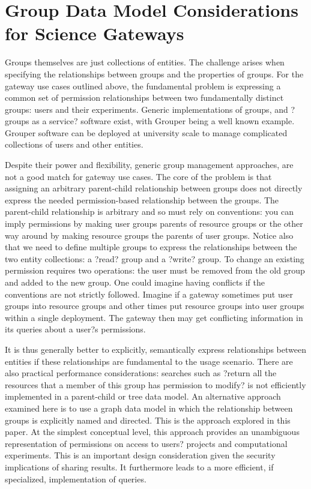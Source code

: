 \documentclass[sigconf]{acmart}
\begin{document}
\section{Group Data Model Considerations for Science Gateways}

Groups themselves are just collections of entities.  The challenge arises when specifying the relationships between groups and the properties of groups.   For the gateway use cases outlined above, the fundamental problem is expressing a common set of permission relationships between two fundamentally distinct groups: users and their experiments.  
Generic implementations of groups, and ?groups as a service? software exist, with Grouper \cite{grouperWebsite} being a well known example. Grouper software can be deployed at university scale to manage complicated collections of users and other entities.

Despite their power and flexibility, generic group management approaches, are not a good match for gateway use cases. The core of the problem is that assigning an arbitrary parent-child relationship between groups does not directly express the needed permission-based relationship between the groups.  The parent-child relationship is arbitrary and so must rely on conventions: you can imply permissions by making user groups parents of resource groups or the other way around by making resource groups the parents of user groups. Notice also that we need to define multiple groups to express the relationships between the two entity collections: a ?read? group and a ?write? group. To change an existing permission requires two operations: the user must be removed from the old group and added to the new group. One could imagine having conflicts if the conventions are not strictly followed. Imagine if a gateway sometimes put user groups into resource groups and other times put resource groups into user groups within a single deployment. The gateway then may get conflicting information in its queries about a user?s permissions. 

It is thus generally better to explicitly, semantically express relationships between entities if these relationships are fundamental to the usage scenario.  There are also practical performance considerations: searches such as ?return all the resources that a member of this group has permission to modify? is not efficiently implemented in a parent-child or tree data model. 
An alternative approach examined here is to use a graph data model in which the relationship between groups is explicitly named and directed.  This is the approach explored in this paper. At the simplest conceptual level, this approach provides an unambiguous representation of permissions on access to users? projects and computational experiments. This is an important design consideration given the security implications of sharing results. It furthermore leads to a more efficient, if specialized, implementation of queries. 
\end{document}
